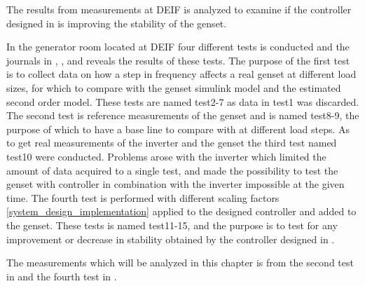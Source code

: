 \label{ca:results}
The results from measurements at DEIF is analyzed to examine if the controller designed in  is improving the stability of the genset. 

In the generator room located at DEIF four different tests is conducted and the journals in , ,  and  reveals the results of these tests.
The purpose of the first test is to collect data on how a step in frequency affects a real genset at different load sizes, for which to compare with the genset simulink model and the estimated second order model. These tests are named test2-7 as data in test1 was discarded.
The second test is reference measurements of the genset and is named test8-9, the purpose of which to have a base line to compare with at different load steps.
As to get real measurements of the inverter and the genset the third test named test10 were conducted. Problems arose with the inverter which limited the amount of data acquired to a single test, and made the possibility to test the genset with controller in combination with the inverter impossible at the given time.
The fourth test is performed with different scaling factors \ref{system_design_implementation} applied to the designed controller and added to the genset. These tests is named test11-15, and the purpose is to test for any improvement or decrease in stability obtained by the controller designed in .


The measurements which will be analyzed in this chapter is from the second test in  and the fourth test in .

